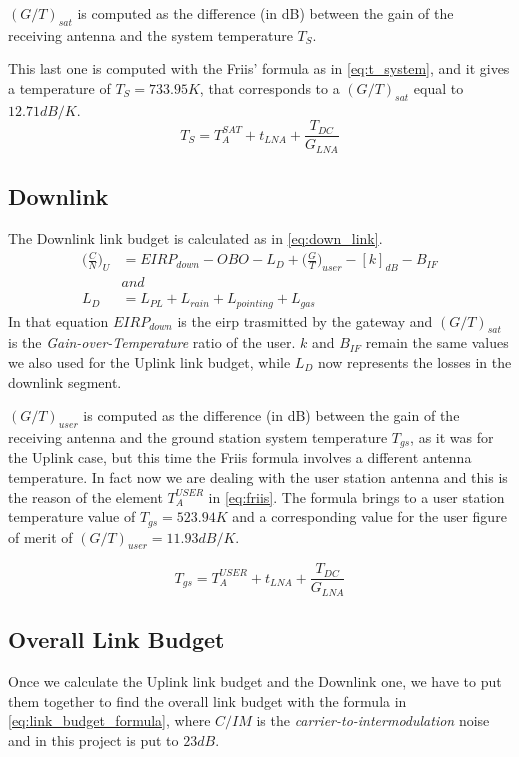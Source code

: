 	$(G/T)_{sat}$ is computed as the difference (in dB) between the gain of the receiving antenna and the system temperature $T_S$.

	This last one is computed with the Friis' formula as in \autoref{eq:t_system}, and it gives a temperature of $T_S = 733.95K$, that corresponds to a $(G/T)_{sat}$ equal to $12.71dB/K$.
	\begin{equation}\label{eq:t_system}
		T_S = T_A^{SAT} + t_{LNA} + \frac{T_{DC}}{G_{LNA}}
	\end{equation}
\subsection{Downlink}
	The Downlink link budget is calculated as in \autoref{eq:down_link}.
	\begin{equation}
	\begin{split}
			\bigg(\frac{C}{N}\bigg)_U &= EIRP_{down} - OBO - L_D + \bigg(\frac{G}{T}\bigg)_{user} - [k]_{dB} - B_{IF}\\
	&and\\
			L_D &= L_{PL} + L_{rain} + L_{pointing} + L_{gas}
	\end{split}
	\label{eq:down_link}
	\end{equation}
	In that equation $EIRP_{down}$ is the \gls{eirp} trasmitted by the gateway and $(G/T)_{sat}$ is the \textit{Gain-over-Temperature} ratio of the user. $k$ and $B_{IF}$ remain the same values we also used for the Uplink link budget, while $L_D$ now represents the losses in the downlink segment.

	$(G/T)_{user}$ is computed as the difference (in dB) between the gain of the receiving antenna and the ground station system temperature $T_{gs}$, as it was for the Uplink case, but this time the Friis formula involves a different antenna temperature. In fact now we are dealing with the user station antenna and this is the reason of the element $T_A^{USER}$ in \autoref{eq:friis}. The formula brings to a user station temperature value of $T_{gs} = 523.94 K$ and a corresponding value for the user figure of merit of $(G/T)_{user} = 11.93 dB/K$.

	\begin{equation}\label{eq:friis}
		T_{gs} = T_A^{USER} + t_{LNA} + \frac{T_{DC}}{G_{LNA}}
	\end{equation}
\subsection{Overall Link Budget}
Once we calculate the Uplink link budget and the Downlink one, we have to put them together to find the overall link budget with the formula in \autoref{eq:link_budget_formula}, where $C/IM$ is the \textit{carrier-to-intermodulation} noise and in this project is put to $23dB$.

